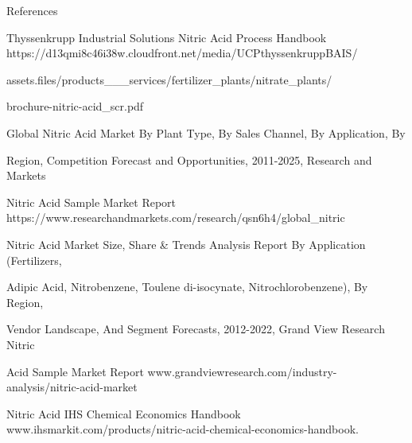 \documentclass[a4paper,portrait,12pt]{article}
\begin{document}
\begin{flushleft}
\newpage
\newpage
References
\end{flushleft}


\begin{flushleft}
[1] Thyssenkrupp Industrial Solutions Nitric Acid Process Handbook https://d13qmi8c46i38w.cloudfront.net/media/UCPthyssenkruppBAIS/
\end{flushleft}


\begin{flushleft}
assets.files/products\_\_\_services/fertilizer\_plants/nitrate\_plants/
\end{flushleft}


\begin{flushleft}
brochure-nitric-acid\_scr.pdf
\end{flushleft}


\begin{flushleft}
[2] Global Nitric Acid Market By Plant Type, By Sales Channel, By Application, By
\end{flushleft}


\begin{flushleft}
Region, Competition Forecast and Opportunities, 2011-2025, Research and Markets
\end{flushleft}


\begin{flushleft}
Nitric Acid Sample Market Report https://www.researchandmarkets.com/research/qsn6h4/global\_nitric
\end{flushleft}


\begin{flushleft}
[3] Nitric Acid Market Size, Share \& Trends Analysis Report By Application (Fertilizers,
\end{flushleft}


\begin{flushleft}
Adipic Acid, Nitrobenzene, Toulene di-isocynate, Nitrochlorobenzene), By Region,
\end{flushleft}


\begin{flushleft}
Vendor Landscape, And Segment Forecasts, 2012-2022, Grand View Research Nitric
\end{flushleft}


\begin{flushleft}
Acid Sample Market Report www.grandviewresearch.com/industry-analysis/nitric-acid-market
\end{flushleft}


\begin{flushleft}
[4] Nitric Acid IHS Chemical Economics Handbook www.ihsmarkit.com/products/nitric-acid-chemical-economics-handbook.
\end{flushleft}
\end{document}
